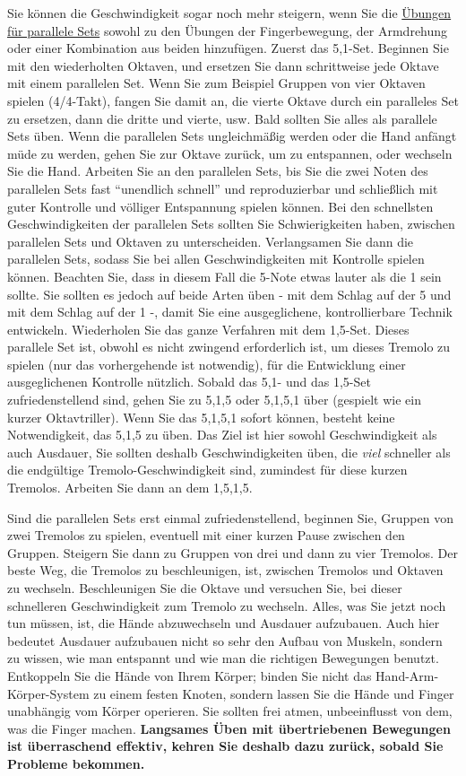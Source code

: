 Sie können die Geschwindigkeit sogar noch mehr steigern, wenn Sie die \hyperref[c1iii7b]{Übungen für parallele Sets} sowohl zu den Übungen der Fingerbewegung, der Armdrehung oder einer Kombination aus beiden hinzufügen.
Zuerst das 5,1-Set.
Beginnen Sie mit den wiederholten Oktaven, und ersetzen Sie dann schrittweise jede Oktave mit einem parallelen Set.
Wenn Sie zum Beispiel Gruppen von vier Oktaven spielen (4/4-Takt), fangen Sie damit an, die vierte Oktave durch ein paralleles Set zu ersetzen, dann die dritte und vierte, usw.
Bald sollten Sie alles als parallele Sets üben.
Wenn die parallelen Sets ungleichmäßig werden oder die Hand anfängt müde zu werden, gehen Sie zur Oktave zurück, um zu entspannen, oder wechseln Sie die Hand.
Arbeiten Sie an den parallelen Sets, bis Sie die zwei Noten des parallelen Sets fast \enquote{unendlich schnell} und reproduzierbar und schließlich mit guter Kontrolle und völliger Entspannung spielen können.
Bei den schnellsten Geschwindigkeiten der parallelen Sets sollten Sie Schwierigkeiten haben, zwischen parallelen Sets und Oktaven zu unterscheiden.
Verlangsamen Sie dann die parallelen Sets, sodass Sie bei allen Geschwindigkeiten mit Kontrolle spielen können.
Beachten Sie, dass in diesem Fall die 5-Note etwas lauter als die 1 sein sollte.
Sie sollten es jedoch auf beide Arten üben - mit dem Schlag auf der 5 und mit dem Schlag auf der 1 -, damit Sie eine ausgeglichene, kontrollierbare Technik entwickeln.
Wiederholen Sie das ganze Verfahren mit dem 1,5-Set.
Dieses parallele Set ist, obwohl es nicht zwingend erforderlich ist, um dieses Tremolo zu spielen (nur das vorhergehende ist notwendig), für die Entwicklung einer ausgeglichenen Kontrolle nützlich.
Sobald das 5,1- und das 1,5-Set zufriedenstellend sind, gehen Sie zu 5,1,5 oder 5,1,5,1 über (gespielt wie ein kurzer Oktavtriller).
Wenn Sie das 5,1,5,1 sofort können, besteht keine Notwendigkeit, das 5,1,5 zu üben.
Das Ziel ist hier sowohl Geschwindigkeit als auch Ausdauer, Sie sollten deshalb Geschwindigkeiten üben, die \textit{viel} schneller als die endgültige Tremolo-Geschwindigkeit sind, zumindest für diese kurzen Tremolos.
Arbeiten Sie dann an dem 1,5,1,5.

Sind die parallelen Sets erst einmal zufriedenstellend, beginnen Sie, Gruppen von zwei Tremolos zu spielen, eventuell mit einer kurzen Pause zwischen den Gruppen.
Steigern Sie dann zu Gruppen von drei und dann zu vier Tremolos.
Der beste Weg, die Tremolos zu beschleunigen, ist, zwischen Tremolos und Oktaven zu wechseln.
Beschleunigen Sie die Oktave und versuchen Sie, bei dieser schnelleren Geschwindigkeit zum Tremolo zu wechseln.
Alles, was Sie jetzt noch tun müssen, ist, die Hände abzuwechseln und Ausdauer aufzubauen.
Auch hier bedeutet Ausdauer aufzubauen nicht so sehr den Aufbau von Muskeln, sondern zu wissen, wie man entspannt und wie man die richtigen Bewegungen benutzt.
Entkoppeln Sie die Hände von Ihrem Körper; binden Sie nicht das Hand-Arm-Körper-System zu einem festen Knoten, sondern lassen Sie die Hände und Finger unabhängig vom Körper operieren.
Sie sollten frei atmen, unbeeinflusst von dem, was die Finger machen.
\textbf{Langsames Üben mit übertriebenen Bewegungen ist überraschend effektiv, kehren Sie deshalb dazu zurück, sobald Sie Probleme bekommen.}


